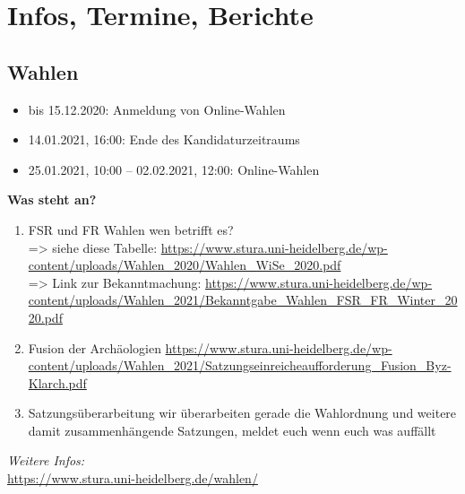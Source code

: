 \section{Infos, Termine, Berichte}
\subsection{Wahlen}
\begin{itemize}
    \item bis 15.12.2020: Anmeldung von Online-Wahlen
    \item 14.01.2021, 16:00: Ende des Kandidaturzeitraums
    \item 25.01.2021, 10:00 – 02.02.2021, 12:00: Online-Wahlen
\end{itemize}
\textbf{Was steht an?}
\begin{enumerate}
    \item FSR und FR Wahlen wen betrifft es?\\
    => siehe diese Tabelle: \url{https://www.stura.uni-heidelberg.de/wp-content/uploads/Wahlen_2020/Wahlen_WiSe_2020.pdf}\\
    => Link zur Bekanntmachung: \url{https://www.stura.uni-heidelberg.de/wp-content/uploads/Wahlen_2021/Bekanntgabe_Wahlen_FSR_FR_Winter_2020.pdf}
    \item Fusion der Archäologien \url{https://www.stura.uni-heidelberg.de/wp-content/uploads/Wahlen_2021/Satzungseinreicheaufforderung_Fusion_Byz-Klarch.pdf}
    \item  Satzungsüberarbeitung wir überarbeiten gerade die Wahlordnung und weitere damit zusammenhängende Satzungen, meldet euch wenn euch was auffällt
\end{enumerate}
\emph{Weitere Infos:}\\
\url{https://www.stura.uni-heidelberg.de/wahlen/}

